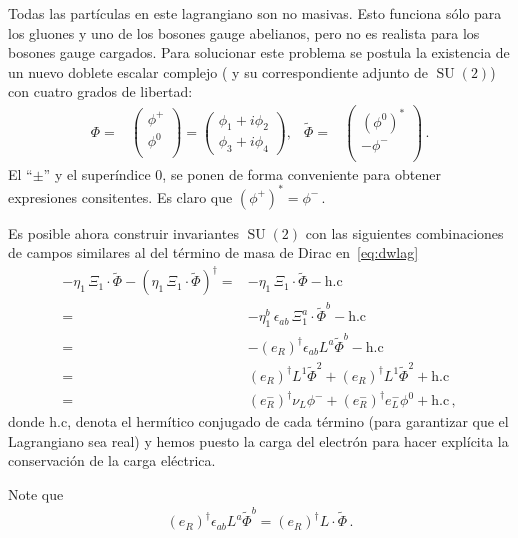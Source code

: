 \begin{frame}
Todas las partículas en este lagrangiano son no masivas. Esto funciona sólo para los gluones y uno de los bosones gauge abelianos, pero no es realista para los bosones gauge cargados. 
Para solucionar este problema se postula la existencia de un nuevo doblete escalar complejo
( y su correspondiente adjunto de $\operatorname{SU}(2)$) con cuatro grados de libertad:
\begin{align}
\label{eq:Phi}
  \Phi=&
  \begin{pmatrix}
    \phi^+\\
    \phi^0\\
  \end{pmatrix}=
  \begin{pmatrix}
    \phi_1+i\phi_2\\
\phi_3+i\phi_4
  \end{pmatrix},&
\widetilde{\Phi}=&
  \begin{pmatrix}
    \left( \phi^0 \right)^{*}\\
   -\phi^-\\
  \end{pmatrix}\,.
\end{align}
El  ``$\pm$'' y el superíndice 0, se ponen de forma conveniente para obtener expresiones consitentes. Es claro que $\left( \phi^+ \right)^{*}=\phi^-\,.$





Es posible ahora construir invariantes $\operatorname{SU}(2)$ con las siguientes combinaciones de campos similares al del término de masa de Dirac en~\eqref{eq:dwlag}
\begin{align}
 -\eta_1\,\Xi_1\cdot\widetilde{\Phi}-\left(\eta_1\,\Xi_1\cdot\widetilde{\Phi}  \right)^{\dagger}
 =& -\eta_1\,\Xi_1\cdot\widetilde{\Phi}-\text{h.c}\nonumber\\
 =& -\eta^{b}_1\,\epsilon_{ab}\,\Xi_1^{a}\cdot\widetilde{\Phi}^{b}-\text{h.c} \nonumber\\
   =&-\left( e_R \right)^{\dagger}\epsilon_{ab}L^a\widetilde{\Phi}^b -\text{h.c} \nonumber\\
   =&\left( e_R \right)^{\dagger}L^1\widetilde{\Phi}^2+\left( e_R \right)^{\dagger}L^1\widetilde{\Phi}^2 +\text{h.c} \nonumber\\
   =&\left( e_R^{-} \right)^{\dagger}\nu_L\phi^- +\left( e_R^{-} \right)^{\dagger}e_L^-\phi^0 +\text{h.c} \,,
 \end{align}
donde $\text{h.c}$, denota el hermítico conjugado de cada término (para garantizar que el Lagrangiano sea real)
y hemos puesto la carga del electrón para hacer explícita la conservación de la carga eléctrica. 

Note que
\begin{align}
  \left( e_R \right)^{\dagger}\epsilon_{ab}L^a\widetilde{\Phi}^b=\left( e_R \right)^{\dagger}L\cdot \widetilde{\Phi}\,.
\end{align}


\end{frame}
